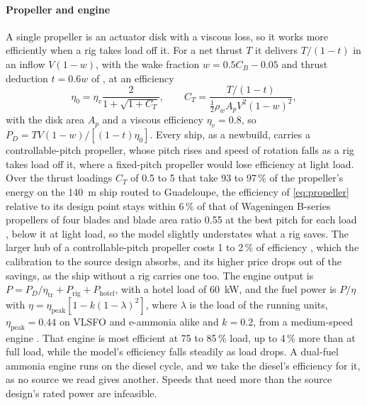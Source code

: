 \paragraph{Propeller and engine} A single propeller is an actuator disk with a viscous loss, so it works more efficiently when a rig takes load off it. For a net thrust $T$ it delivers $T/(1-t)$ in an inflow $V(1-w)$, with the wake fraction $w=0.5C_B-0.05$ and thrust deduction $t=0.6w$ of \citet{man2011}, at an efficiency
\begin{equation}
\eta_0 = \eta_v \frac{2}{1+\sqrt{1+C_T}}, \qquad C_T = \frac{T/(1-t)}{\tfrac12\rho_w A_p V^2(1-w)^2},
\label{eq:propeller}
\end{equation}
with the disk area $A_p$ and a viscous efficiency $\eta_v=0.8$, so $P_D = T V (1-w) / [(1-t)\eta_0]$. Every ship, as a newbuild, carries a controllable-pitch propeller, whose pitch rises and speed of rotation falls as a rig takes load off it, where a fixed-pitch propeller would lose efficiency at light load. Over the thrust loadings $C_T$ of 0.5 to 5 that take 93 to 97\,\% of the propeller's energy on the \SI{140}{m} ship routed to Guadeloupe, the efficiency of \cref{eq:propeller} relative to its design point stays within 6\,\% of that of Wageningen B-series propellers of four blades and blade area ratio 0.55 at the best pitch for each load \citep{oosterveld1975}, below it at light load, so the model slightly understates what a rig saves. The larger hub of a controllable-pitch propeller costs 1 to 2\,\% of efficiency \citep[p.~19]{man2011}, which the calibration to the source design absorbs, and its higher price drops out of the savings, as the ship without a rig carries one too. The engine output is $P = P_D/\eta_\mathrm{tr} + P_\mathrm{rig} + P_\mathrm{hotel}$, with a hotel load of \SI{60}{kW}, and the fuel power is $P/\eta$ with $\eta = \eta_\mathrm{peak}[1-k(1-\lambda)^2]$, where $\lambda$ is the load of the running units, $\eta_\mathrm{peak}=0.44$ on VLSFO and e-ammonia alike and $k=0.2$, from a medium-speed engine \citep[p.~137]{man2024l2131}. That engine is most efficient at 75 to 85\,\% load, up to 4\,\% more than at full load, while the model's efficiency falls steadily as load drops. A dual-fuel ammonia engine runs on the diesel cycle, and we take the diesel's efficiency for it, as no source we read gives another. Speeds that need more than the source design's rated power are infeasible.

